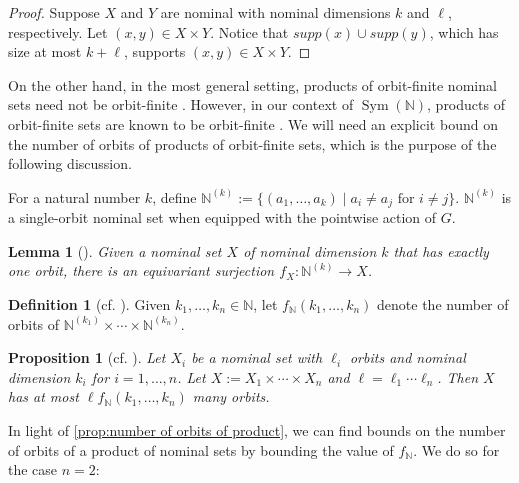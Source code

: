 \documentclass[11pt,a4paper]{amsart}
\newtheorem{lemma}{Lemma}
\newtheorem{proposition}{Proposition}
\theoremstyle{definition}
\newtheorem{definition}{Definition}
\newcommand{\bb}{\mathbb}
\DeclareMathOperator{\Sym}{Sym}
\newif\ifappendix
\begin{document}
\begin{proof}
    Suppose $X$ and $Y$ are nominal with nominal dimensions $k$ and $\ell$, respectively. 
    Let $(x,y) \in X \times Y$.
    Notice that $supp(x) \cup supp(y)$, which has size at most $k + \ell$, supports $(x,y) \in X \times Y$.
\end{proof}

On the other hand, in the most general setting, products of orbit-finite nominal sets need not be orbit-finite \cite[Example 2.5]{bojanczyk-klin-lasota:automata-theory-in-nominal-sets}.
However, in our context of $\Sym(\bb N)$, products of orbit-finite sets are known to be orbit-finite \cite[Section 10]{bojanczyk-klin-lasota:automata-theory-in-nominal-sets}. 
We will need an explicit bound on the number of orbits of products of orbit-finite sets, which is the purpose of the following discussion.

For a natural number $k$, define $\bb N^{(k)} := \{(a_1, \ldots, a_k) \mid a_i \neq a_j \text{ for } i \neq j\}$.
$\bb N^{(k)}$ is a single-orbit nominal set when equipped with the pointwise action of $G$.

\begin{lemma}[{\cite[Lemma 4.13]{bojanczyk-klin-lasota:automata-theory-in-nominal-sets}}] \label{lem:single orbit set is surjective image of N^(k)}
    Given a nominal set $X$ of nominal dimension $k$ that has exactly one orbit, there is an equivariant surjection $f_X : \bb N^{(k)} \to X$.
\end{lemma}

\begin{definition}[{cf. \cite[Section 3]{moerman-etal:learning-nominal-automata}}]
    Given $k_1, \ldots, k_n \in \bb N$, let $f_{\bb N}(k_1, \ldots, k_n)$ denote the number of orbits of $\bb N^{(k_1)} \times \cdots \times \bb N^{(k_n)}$. 
\end{definition}

\begin{proposition}[{cf. \cite[Section 3]{moerman-etal:learning-nominal-automata}}]\label{prop:number of orbits of product}
    Let $X_i$ be a nominal set with $\ell_i$ orbits and nominal dimension $k_i$ for $i=1, \ldots, n$.
    Let $X := X_1 \times \cdots \times X_n$ and $\ell = \ell_1 \cdots \ell_n$. Then $X$ has at most $\ell f_{\bb N}(k_1, \ldots, k_n)$ many orbits.
\end{proposition}

\ifappendix \autoref{prop:number of orbits of product} is stated but not proven in \cite{moerman-etal:learning-nominal-automata}. For completeness, we include a proof in Appendix \ref{appendix:proof of number of orbits of product}. \fi
In light of \autoref{prop:number of orbits of product}, we can find bounds on the number of orbits of a product of nominal sets by bounding the value of $f_{\bb N}$.
We do so for the case $n=2$:
\end{document}
